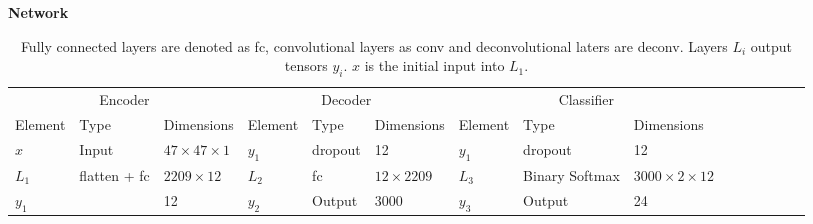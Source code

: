 \begin{landscape}
	\begin{table}[h] {\footnotesize
			\centering
			\caption*{\textbf{Network \networkI}}
			\begin{tabular}{lllllllllllllll}
				\cline{1-9}
				\multicolumn{3}{|c|}{Encoder}                                                              & \multicolumn{3}{c|}{Decoder}                                                 & \multicolumn{3}{c|}{Classifier}                                                            &  &  &  &  &  &  \\ \cline{1-9}
				\multicolumn{1}{|l|}{Element} & Type         & \multicolumn{1}{l|}{Dimensions}             & \multicolumn{1}{l|}{Element} & Type    & \multicolumn{1}{l|}{Dimensions}     & \multicolumn{1}{l|}{Element} & Type           & \multicolumn{1}{l|}{Dimensions}            &   &   &   &   &   &   \\ \cline{1-9}
				\multicolumn{1}{|l|}{$x$}     & Input        & \multicolumn{1}{l|}{$47\times 47 \times 1$} & \multicolumn{1}{l|}{$y_1$}   & dropout & \multicolumn{1}{l|}{12}             & \multicolumn{1}{l|}{$y_1$}   & dropout        & \multicolumn{1}{l|}{12}                    &   &   &   &   &   &   \\ \cline{1-9}
				\multicolumn{1}{|l|}{$L_1$}   & flatten + fc & \multicolumn{1}{l|}{$2209\times12$}         & \multicolumn{1}{l|}{$L_2$}   & fc      & \multicolumn{1}{l|}{$12\times2209$} & \multicolumn{1}{l|}{$L_3$}   & Binary Softmax & \multicolumn{1}{l|}{$3000\times2\times12$} &   &   &   &   &   &   \\
				\multicolumn{1}{|l|}{$y_1$}   &              & \multicolumn{1}{l|}{12}                     & \multicolumn{1}{l|}{$y_2$}   & Output  & \multicolumn{1}{l|}{$3000$}         & \multicolumn{1}{l|}{$y_3$}   & Output         & \multicolumn{1}{l|}{24}                    &   &   &   &   &   &   \\ \cline{1-9}
			\end{tabular}}
		\caption{Fully connected layers are denoted as fc, convolutional layers as conv and deconvolutional laters are deconv. Layers $L_i$ output tensors $y_i$. $x$ is the initial input into $L_1$.}
    \label{tab:netI}
	\end{table}


\end{landscape}
